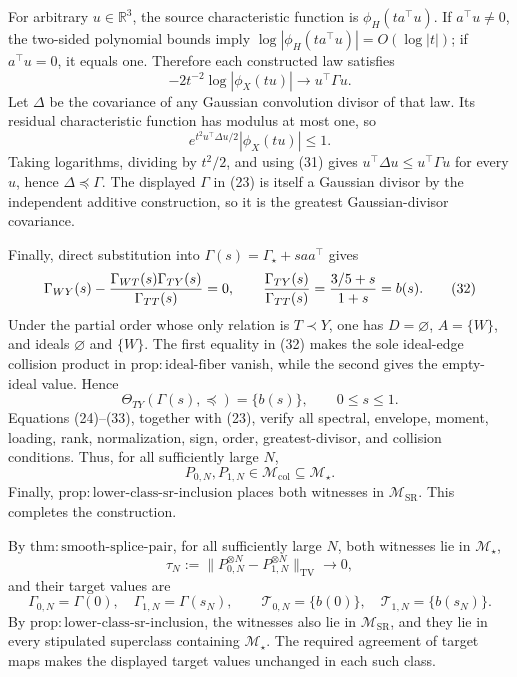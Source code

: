 For arbitrary \(u\in\mathbb R^3\), the source characteristic function is \(\phi_H(ta^\top u)\).  If \(a^\top u\ne0\), the two-sided polynomial bounds imply \(\log|\phi_H(ta^\top u)|=O(\log|t|)\); if \(a^\top u=0\), it equals one.  Therefore each constructed law satisfies
\[
 -2t^{-2}\log|\phi_X(tu)|\longrightarrow u^\top\Gamma u. \tag{31}
\]
Let \(\Delta\) be the covariance of any Gaussian convolution divisor of that law.  Its residual characteristic function has modulus at most one, so
\[
 e^{t^2u^\top\Delta u/2}|\phi_X(tu)|\le1.
\]
Taking logarithms, dividing by \(t^2/2\), and using (31) gives \(u^\top\Delta u\le u^\top\Gamma u\) for every \(u\), hence \(\Delta\preceq\Gamma\).  The displayed \(\Gamma\) in (23) is itself a Gaussian divisor by the independent additive construction, so it is the greatest Gaussian-divisor covariance.

Finally, direct substitution into \(\Gamma(s)=\Gamma_\star+saa^\top\) gives
\[
 \Gamma_{WY}(s)-{\Gamma_{WT}(s)\Gamma_{TY}(s)\over\Gamma_{TT}(s)}=0,
 \qquad
 {\Gamma_{TY}(s)\over\Gamma_{TT}(s)}
 ={3/5+s\over1+s}=b(s). \tag{32}
\]
Under the partial order whose only relation is \(T\prec Y\), one has \(D=\varnothing\), \(A=\{W\}\), and ideals \(\varnothing\) and \(\{W\}\).  The first equality in (32) makes the sole ideal-edge collision product in \(\mathrm{prop:ideal\text{-}fiber}\) vanish, while the second gives the empty-ideal value.  Hence
\[
 \Theta_{TY}(\Gamma(s),\preceq)=\{b(s)\},
 \qquad0\le s\le1. \tag{33}
\]
Equations (24)--(33), together with (23), verify all spectral, envelope, moment, loading, rank, normalization, sign, order, greatest-divisor, and collision conditions.  Thus, for all sufficiently large \(N\),
\[
 P_{0,N},P_{1,N}\in\mathcal M_{\mathrm{col}}\subseteq\mathcal M_\star.
\]
Finally, \(\mathrm{prop:lower\text{-}class\text{-}sr\text{-}inclusion}\) places both witnesses in \(\mathcal M_{\mathrm{SR}}\).  This completes the construction.

By \(\mathrm{thm:smooth\text{-}splice\text{-}pair}\), for all sufficiently large \(N\), both witnesses lie in \(\mathcal M_\star\),
\[
 \tau_N:=\|P_{0,N}^{\otimes N}-P_{1,N}^{\otimes N}\|_{\mathrm{TV}}
 \longrightarrow0,
\]
and their target values are
\[
 \Gamma_{0,N}=\Gamma(0),\quad \Gamma_{1,N}=\Gamma(s_N),
 \qquad
 \mathcal T_{0,N}=\{b(0)\},\quad \mathcal T_{1,N}=\{b(s_N)\}.
\]
By \(\mathrm{prop:lower\text{-}class\text{-}sr\text{-}inclusion}\), the witnesses also lie in \(\mathcal M_{\mathrm{SR}}\), and they lie in every stipulated superclass containing \(\mathcal M_\star\).  The required agreement of target maps makes the displayed target values unchanged in each such class.

